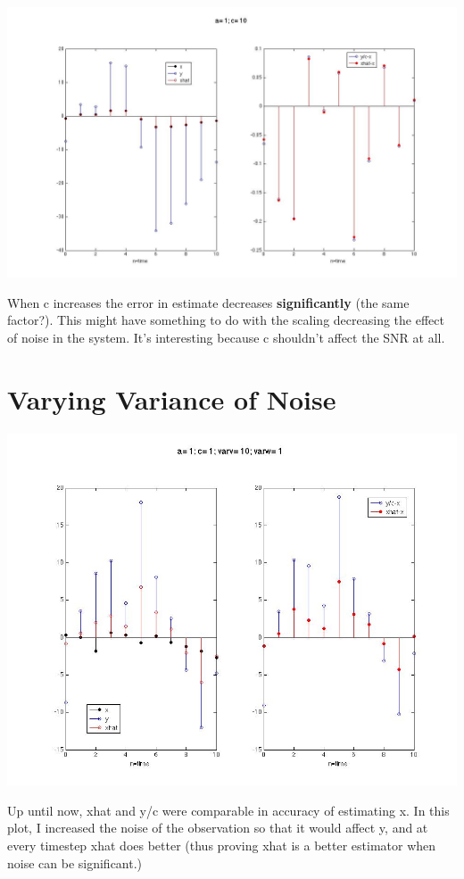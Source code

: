\documentclass[leqno]{article}
\begin{document}
\begin{center}\includegraphics[scale=0.3]{fig7}\end{center}
When c increases the error in estimate decreases \textbf{significantly} (the same factor?). This might have something to do with the scaling decreasing the effect of noise in the system. It's interesting because c shouldn't affect the SNR at all.
\section{Varying Variance of Noise}
\begin{center}\includegraphics[scale=0.3]{fig8}\end{center}
Up until now, xhat and y/c were comparable in accuracy of estimating x. In this plot, I increased the noise of the observation so that it would affect y, and at every timestep xhat does better (thus proving xhat is a better estimator when noise can be significant.)
\end{document}
